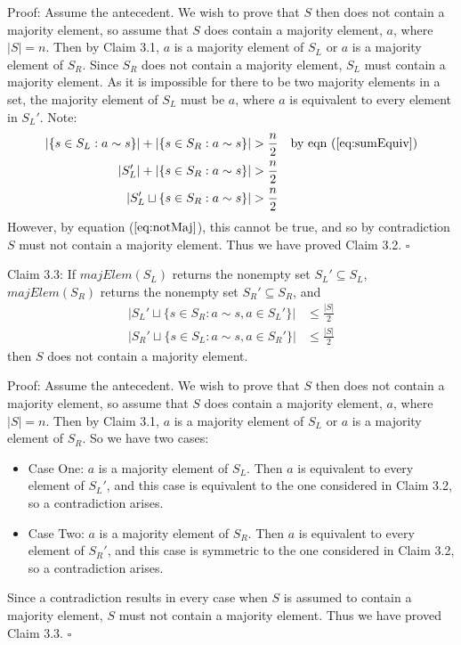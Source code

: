 \documentclass{article}
\begin{document}
Proof: Assume the antecedent. We wish to prove that $S$ then does not contain a
majority element, so assume that $S$ does contain a majority element, $a$, where
$|S|=n$. Then by Claim 3.1, $a$ is a majority element of $S_L$ or $a$ is a
majority element of $S_R$. Since $S_R$ does not contain a majority element,
$S_L$ must contain a majority element. As it is impossible for there to be two
majority elements in a set, the majority element of $S_L$ must be $a$, where
$a$ is equivalent to every element in $S_L'$. Note:
\begin{align*}
|\{s \in S_L : a \sim s\}| + |\{s \in S_R : a \sim s\}| &> \frac{n}{2}
&\text{by eqn (\ref{eq:sumEquiv})} \\
|S_L'| + |\{s \in S_R : a \sim s\}| &> \frac{n}{2} \\
|S_L' \sqcup \{s \in S_R : a \sim s\}| &> \frac{n}{2}
\end{align*}
However, by equation ($\ref{eq:notMaj}$), this cannot be true, and so by
contradiction $S$ must not contain a majority element. Thus we have proved
Claim 3.2. $\square$

Claim 3.3: If $majElem(S_L)$ returns the nonempty set $S_L' \subseteq S_L$,
$majElem(S_R)$ returns the nonempty set $S_R' \subseteq S_R$, and
\begin{align*}
|S_L' \sqcup \{s \in S_R : a \sim s, a \in S_L'\}| &\leq \frac{|S|}{2} \\
|S_R' \sqcup \{s \in S_L : a \sim s, a \in S_R'\}| &\leq \frac{|S|}{2}
\end{align*}
then $S$ does not contain a majority element.

Proof: Assume the antecedent. We wish to prove that $S$ then does not contain a
majority element, so assume that $S$ does contain a majority element, $a$, where
$|S|=n$. Then by Claim 3.1, $a$ is a majority element of $S_L$ or $a$ is a
majority element of $S_R$. So we have two cases:
\begin{itemize}
\item Case One: $a$ is a majority element of $S_L$. Then $a$ is equivalent
to every element of $S_L'$, and this case is equivalent to the one considered
in Claim 3.2, so a contradiction arises.
\item Case Two: $a$ is a majority element of $S_R$. Then $a$ is equivalent
to every element of $S_R'$, and this case is symmetric to the one considered
in Claim 3.2, so a contradiction arises.
\end{itemize}
Since a contradiction results in every case when $S$ is assumed to contain a
majority element, $S$ must not contain a majority element. Thus we have proved
Claim 3.3. $\square$
\end{document}
